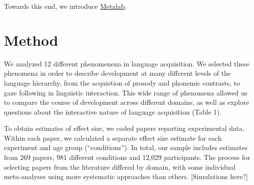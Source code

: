\documentclass[american,floatsintext,man]{apa6}
\begin{document}
Towards this end, we introduce
\href{http://metalab.stanford.edu/}{Metalab}.

\section{Method}\label{method}

We analyzed 12 different phenomenena in language acquisition. We
selected these phenomena in order to describe development at many
different levels of the language hierarchy, from the acquistion of
prosody and phonemic contrasts, to gaze following in linguistic
interaction. This wide range of phenomena allowed us to compare the
course of development across different domains, as well as explore
questions about the interactive nature of language acquisition (Table
1).

To obtain estimates of effect size, we coded papers reporting
experimental data. Within each paper, we calculated a separate effect
size estimate for each experiment and age group (\enquote{conditions}).
In total, our sample includes estimates from 269 papers, 981 different
conditions and 12,029 participants. The process for selecting papers
from the literature differed by domain, with some individual
meta-analyses using more systematic approaches than others.
{[}Simulations here?{]} \renewcommand{\arraystretch}{1.5}
\end{document}
